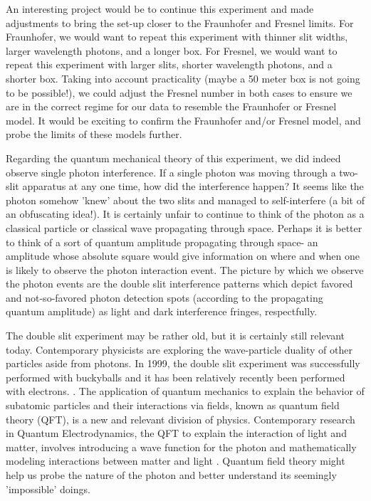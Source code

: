 \documentclass[prb,preprint]{revtex4-1}
\begin{document}
An interesting project would be to continue this experiment and made adjustments to bring the set-up closer to the Fraunhofer and Fresnel limits.  For Fraunhofer, we would want to repeat this experiment with thinner slit widths, larger wavelength photons, and a longer box.  For Fresnel, we would want to repeat this experiment with larger slits, shorter wavelength photons, and a shorter box.  Taking into account practicality (maybe a 50 meter box is not going to be possible!), we could adjust the Fresnel number in both cases to ensure we are in the correct regime for our data to resemble the Fraunhofer or Fresnel model.  It would be exciting to confirm the Fraunhofer and/or Fresnel model, and probe the limits of these models further.

Regarding the quantum mechanical theory of this experiment, we did indeed observe single photon interference.  If a single photon was moving through a two-slit apparatus at any one time, how did the interference happen?  It seems like the photon somehow 'knew' about the two slits and managed to self-interfere (a bit of an obfuscating idea!).  It is certainly unfair to continue to think of the photon as a classical particle or classical wave propagating through space.  Perhaps it is better to think of a sort of quantum amplitude propagating through space- an amplitude whose absolute square would give information on where and when one is likely to observe the photon interaction event.  The picture by which we observe the photon events are the double slit interference patterns which depict favored and not-so-favored photon detection spots (according to the propagating quantum amplitude) as light and dark interference fringes, respectfully.  \cite{teachspin}

The double slit experiment may be rather old, but it is certainly still relevant today.  Contemporary physicists are exploring the wave-particle duality of other particles aside from photons.  In 1999, the double slit experiment was successfully performed with buckyballs and it has been relatively recently been performed with electrons.   \cite{bucky}.  The application of quantum mechanics to explain the behavior of subatomic particles and their interactions via fields, known as quantum field theory (QFT), is a new and relevant division of physics.  Contemporary research in Quantum Electrodynamics, the QFT to explain the interaction of light and matter, involves introducing a wave function for the photon and mathematically modeling interactions between matter and light \cite{iwo}.  Quantum field theory might help us probe the nature of the photon and better understand its seemingly 'impossible' doings.
\end{document}
